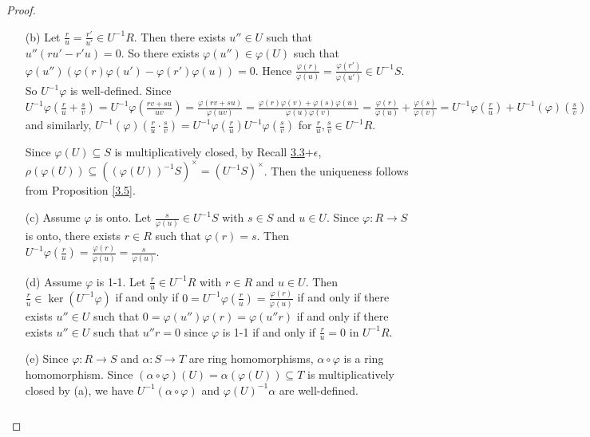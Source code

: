 \begin{proof}
    \begin{enumerate}
        \item [(b)] 
            Let $\frac{r}{u} = \frac{r'}{u'} \in U^{-1}R$. Then there exists $u'' \in U$ such that $u''(ru'-r'u) = 0$. So there exists $\varphi(u'') \in \varphi(U)$ such that $\varphi(u'')(\varphi(r)\varphi(u') - \varphi(r')\varphi(u)) = 0$. Hence $\frac{\varphi(r)}{\varphi(u)} = \frac{\varphi(r')}{\varphi(u')} \in U^{-1}S$. So $U^{-1}\varphi$ is well-defined. Since $U^{-1}\varphi(\frac{r}{u} + \frac{s}{v}) = U^{-1}\varphi(\frac{rv+su}{uv}) = \frac{\varphi(rv+su)}{\varphi(uv)} = \frac{\varphi(r)\varphi(v)+\varphi(s)\varphi(u)}{\varphi(u)\varphi(v)} = \frac{\varphi(r)}{\varphi(u)}+\frac{\varphi(s)}{\varphi(v)} = U^{-1}\varphi(\frac{r}{u})+U^{-1}(\varphi)(\frac{s}{v})$ and similarly, $U^{-1}(\varphi)(\frac{r}{u} \cdot\frac{s}{v}) = U^{-1}\varphi(\frac{r}{u})U^{-1}\varphi(\frac{s}{v})$ for $\frac{r}{u},\frac{s}{v} \in U^{-1}R$. \par 
            Since $\varphi(U) \subseteq S$ is multiplicatively closed, by Recall \hyperref[3.3Plus]{3.3$+\epsilon$}, $\rho(\varphi(U)) \subseteq ((\varphi(U))^{-1}S)^{\times} = (U^{-1}S)^{\times}$. Then the uniqueness follows from Proposition \ref{3.5}. 
        \item [(c)]
            Assume $\varphi$ is onto. Let $\frac{s}{\varphi(u)} \in U^{-1}S$ with $s \in S$ and $u \in U$. Since $\varphi: R \to S$ is onto, there exists $r \in R$ such that $\varphi(r) = s$. Then $U^{-1}\varphi(\frac{r}{u}) = \frac{\varphi(r)}{\varphi(u)} = \frac{s}{\varphi(u)}$. 
        \item[(d)] Assume $\varphi$ is 1-1. Let $\frac{r}{u} \in U^{-1}R$ with $r \in R$ and $u \in U$. Then $\frac{r}{u} \in \ker(U^{-1}\varphi)$ if and only if $0 = U^{-1}\varphi(\frac{r}{u}) = \frac{\varphi(r)}{\varphi(u)}$ if and only if there exists $u'' \in U$ such that $0 = \varphi(u'')\varphi(r) = \varphi(u''r)$ if and only if there exists $u'' \in U$ such that $u''r = 0$ since $\varphi$ is 1-1 if and only if $\frac{r}{u} = 0$ in $U^{-1}R$. 
        \item[(e)] 
            Since $\varphi:R \to S$ and $\alpha: S \to T$ are ring homomorphisms, $\alpha \circ \varphi$ is a ring homomorphism. Since $(\alpha \circ \varphi)(U) = \alpha(\varphi(U)) \subseteq T$ is multiplicatively closed by (a), we have $U^{-1}(\alpha \circ \varphi)$ and $\varphi(U)^{-1}\alpha$ are well-defined. 
        \[
            \begin{tikzcd}

\end{tikzcd}\]
\end{enumerate}
\end{proof}
